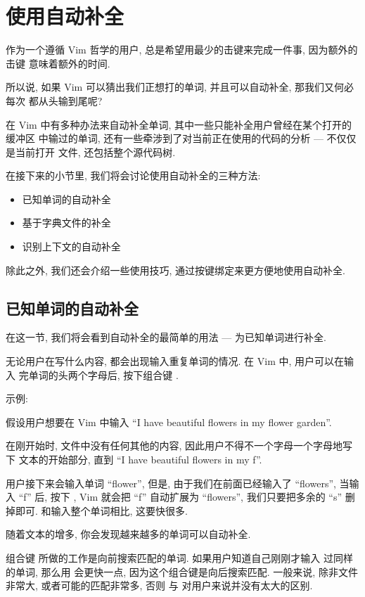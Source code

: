 \section{使用自动补全}
\label{sec:using_autocompletion}

作为一个遵循 Vim 哲学的用户, 总是希望用最少的击键来完成一件事, 因为额外的击键
意味着额外的时间.

所以说, 如果 Vim 可以猜出我们正想打的单词, 并且可以自动补全, 那我们又何必每次
都从头输到尾呢?

在 Vim 中有多种办法来自动补全单词, 其中一些只能补全用户曾经在某个打开的缓冲区
中输过的单词, 还有一些牵涉到了对当前正在使用的代码的分析 --- 不仅仅是当前打开
文件, 还包括整个源代码树.

在接下来的小节里, 我们将会讨论使用自动补全的三种方法:
\begin{itemize}
    \item 已知单词的自动补全
    \item 基于字典文件的补全
    \item 识别上下文的自动补全
\end{itemize}
除此之外, 我们还会介绍一些使用技巧, 通过按键绑定来更方便地使用自动补全.

\subsection{已知单词的自动补全}
\label{subsec:autocompletion_with_known_words}

在这一节, 我们将会看到自动补全的最简单的用法 --- 为已知单词进行补全.

无论用户在写什么内容, 都会出现输入重复单词的情况. 在 Vim 中, 用户可以在输入
完单词的头两个字母后, 按下组合键 .

示例:

假设用户想要在 Vim 中输入 ``I have beautiful flowers in my flower garden''.

在刚开始时, 文件中没有任何其他的内容, 因此用户不得不一个字母一个字母地写下
文本的开始部分, 直到 ``I have beautiful flowers in my f''.

用户接下来会输入单词 ``flower'', 但是, 由于我们在前面已经输入了 ``flowers'',
当输入 ``f'' 后, 按下 , Vim 就会把 ``f'' 自动扩展为 ``flowers'',
我们只要把多余的 ``s'' 删掉即可. 和输入整个单词相比, 这要快很多.

随着文本的增多, 你会发现越来越多的单词可以自动补全.

组合键  所做的工作是向前搜索匹配的单词. 如果用户知道自己刚刚才输入
过同样的单词, 那么用  会更快一点, 因为这个组合键是向后搜索匹配.
一般来说, 除非文件非常大, 或者可能的匹配非常多, 否则  与
 对用户来说并没有太大的区别.

